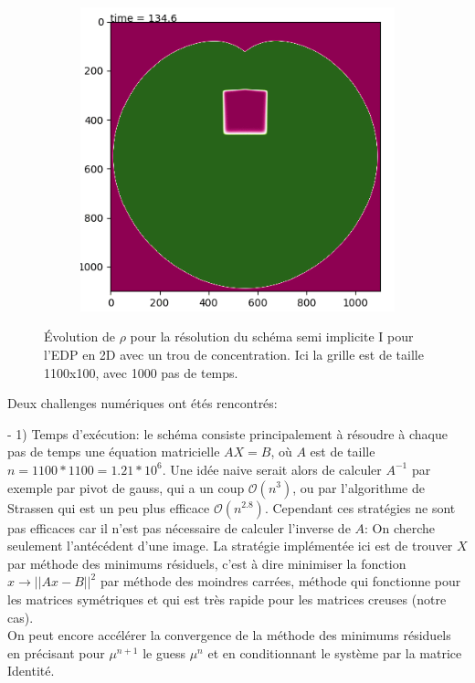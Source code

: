 \documentclass[11pt]{article}
\begin{document}
\begin{figure}[hbt!]
\begin{subfigure}[b]{0.45\textwidth}
\end{subfigure}
\begin{subfigure}[b]{0.45\textwidth}
\includegraphics[width=\textwidth]{Images/rho2d3.png}
\end{subfigure}
\caption{Évolution de $\rho$ pour la résolution du schéma semi implicite I pour l'EDP en 2D avec un trou de concentration. Ici la grille est de taille 1100x100, avec 1000 pas de temps.} 
\end{figure}
\newpage
Deux challenges numériques ont étés rencontrés:
\begin{paragraph}
- 1) Temps d’exécution: le schéma consiste principalement à résoudre à chaque pas de temps une équation matricielle $AX=B$, où $A$ est de taille $n = 1100*1100= 1.21*10^6$. Une idée naive serait alors de calculer $A^{-1}$ par exemple par pivot de gauss, qui a un coup $\mathcal{O}(n^3)$, ou par l'algorithme de Strassen qui est un peu plus efficace $\mathcal{O}(n^{2.8})$. Cependant ces stratégies ne sont pas efficaces car il n'est pas nécessaire de calculer l'inverse de $A$: On cherche seulement l'antécédent d'une image. La stratégie implémentée ici est de trouver $X$ par méthode des minimums résiduels, c'est à dire minimiser la fonction $x\to || Ax-B||^2 $ par méthode des moindres carrées, méthode qui fonctionne pour les matrices symétriques et qui est très rapide pour les matrices creuses (notre cas).\\ On peut encore accélérer la convergence de la méthode des minimums résiduels en précisant pour $\mu^{n+1}$ le guess $\mu^n$ et en conditionnant le système par la matrice Identité. \end{paragraph}
\end{document}
